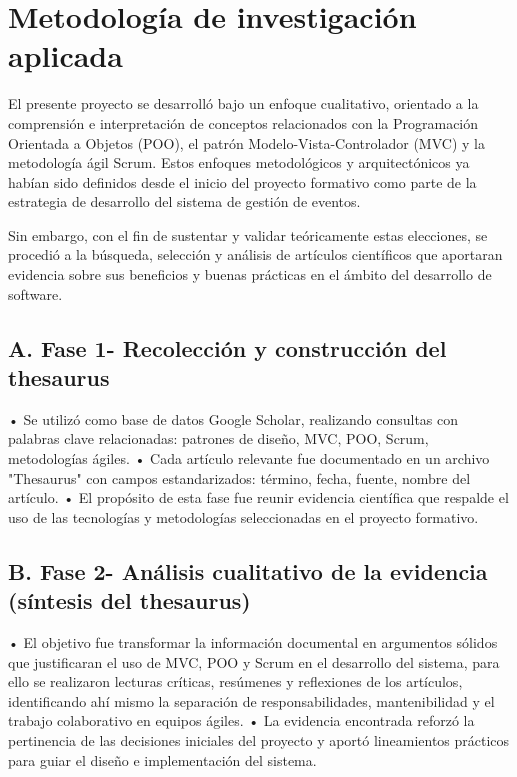 \section{Metodología de investigación aplicada}
El presente proyecto se desarrolló bajo un enfoque cualitativo, orientado a la comprensión e interpretación de conceptos relacionados con la Programación Orientada a Objetos (POO), el patrón Modelo-Vista-Controlador (MVC) y la metodología ágil Scrum. Estos enfoques metodológicos y arquitectónicos ya habían sido definidos desde el inicio del proyecto formativo como parte de la estrategia de desarrollo del sistema de gestión de eventos.

Sin embargo, con el fin de sustentar y validar teóricamente estas elecciones, se procedió a la búsqueda, selección y análisis de artículos científicos que aportaran evidencia sobre sus beneficios y buenas prácticas en el ámbito del desarrollo de software.

\subsection{A. Fase 1- Recolección y construcción del thesaurus}
• Se utilizó como base de datos Google Scholar, realizando consultas con palabras clave relacionadas: patrones de diseño, MVC, POO, Scrum, metodologías ágiles.
• Cada artículo relevante fue documentado en un archivo "Thesaurus" con campos estandarizados: término, fecha, fuente, nombre del artículo.
• El propósito de esta fase fue reunir evidencia científica que respalde el uso de las tecnologías y metodologías seleccionadas en el proyecto formativo.

\subsection{B. Fase 2- Análisis cualitativo de la evidencia (síntesis del thesaurus)}
• El objetivo fue transformar la información documental en argumentos sólidos que justificaran el uso de MVC, POO y Scrum en el desarrollo del sistema, para ello se realizaron lecturas críticas, resúmenes y reflexiones de los artículos, identificando ahí mismo la separación de responsabilidades, mantenibilidad y el trabajo colaborativo en equipos ágiles.
• La evidencia encontrada reforzó la pertinencia de las decisiones iniciales del proyecto y aportó lineamientos prácticos para guiar el diseño e implementación del sistema.